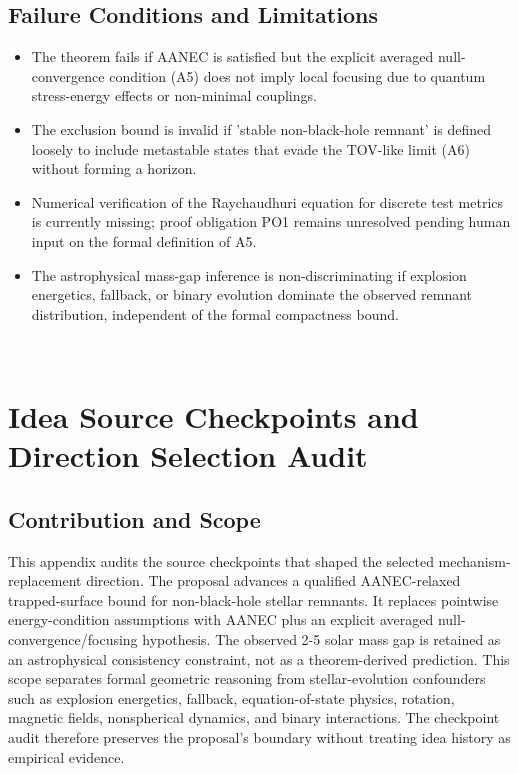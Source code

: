 \documentclass[conference]{IEEEtran}
\begin{document}
\subsection{Failure Conditions and Limitations}
\begin{itemize}
\item The theorem fails if AANEC is satisfied but the explicit averaged null-convergence condition (A5) does not imply local focusing due to quantum stress-energy effects or non-minimal couplings.
\item The exclusion bound is invalid if 'stable non-black-hole remnant' is defined loosely to include metastable states that evade the TOV-like limit (A6) without forming a horizon.
\item Numerical verification of the Raychaudhuri equation for discrete test metrics is currently missing; proof obligation PO1 remains unresolved pending human input on the formal definition of A5.
\item The astrophysical mass-gap inference is non-discriminating if explosion energetics, fallback, or binary evolution dominate the observed remnant distribution, independent of the formal compactness bound.
\end{itemize}~\cite{cite_0ed84243cf171bc4,cite_7a407c865faafd11}

\appendices
\section{Idea Source Checkpoints and Direction Selection Audit}
\subsection{Contribution and Scope}
This appendix audits the source checkpoints that shaped the selected mechanism-replacement direction. The proposal advances a qualified AANEC-relaxed trapped-surface bound for non-black-hole stellar remnants. It replaces pointwise energy-condition assumptions with AANEC plus an explicit averaged null-convergence/focusing hypothesis. The observed 2-5 solar mass gap is retained as an astrophysical consistency constraint, not as a theorem-derived prediction. This scope separates formal geometric reasoning from stellar-evolution confounders such as explosion energetics, fallback, equation-of-state physics, rotation, magnetic fields, nonspherical dynamics, and binary interactions. The checkpoint audit therefore preserves the proposal's boundary without treating idea history as empirical evidence.~\cite{cite_0ed84243cf171bc4}
\end{document}

